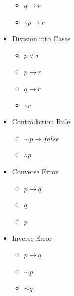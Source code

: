 \documentclass[10pt, portrait]{article}
\renewcommand{\lnot}{\mathord{\sim}}
\begin{document}
\begin{multicols*}{2}
\begin{multicols*}{2}
\begin{itemize}
\begin{itemize}
        \item $q \rightarrow r$
        \item $\therefore p \rightarrow r$
    \end{itemize}
    \item Division into Cases
    \begin{itemize}
        \item $p \lor q$
        \item $p \rightarrow r$
        \item $q \rightarrow r$
        \item $\therefore r$
    \end{itemize}
    \item Contradiction Rule
    \begin{itemize}
        \item $\lnot p \rightarrow false$
        \item $\therefore p$
    \end{itemize}
    \item Converse Error
    \begin{itemize}
        \item $p \rightarrow q$
        \item $q$
        \item $p$
    \end{itemize}
    \item Inverse Error
    \begin{itemize}
        \item $p \rightarrow q$
        \item $\lnot p$
        \item $\lnot q$
    \end{itemize}
\end{itemize}
\end{multicols*}


\end{multicols*}
\end{document}

